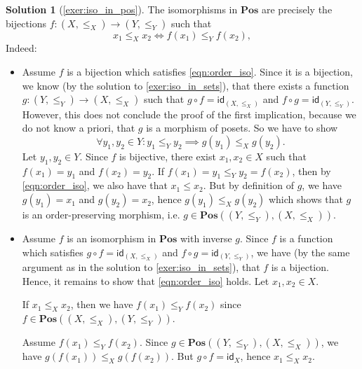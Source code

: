 \documentclass[a4paper,11pt, oneside,titlepage=false]{scrbook}
\theoremstyle{plain}
\theoremstyle{definition}
\newtheorem{solution}[thm]{Solution}
\newcommand{\cfont}[1]{\ensuremath{\mathsf{#1}}}
\newcommand{\Catb}[1]{\mathbf{#1}}
\newcommand{\POS}{\Catb{Pos}}
\newcommand{\CHom}[3]{{#1}(#2,#3)}
\newcommand{\Id}[1][]{\cfont{id}_{#1}}
\newcommand{\co}[2]{\ensuremath{#2 \circ #1}}
\begin{document}
\begin{solution}[\cref{exer:iso_in_pos}]\label{sol:iso_in_pos}
The isomorphisms in $\POS$ are precisely the bijections $f:(X,\leq_X) \to (Y,\leq_Y)$ such that
\begin{equation}\label{eqn:order_iso}
x_1 \leq_X x_2 \iff f(x_1) \leq_Y f(x_2),
\end{equation}
Indeed:
\begin{itemize}
\item Assume $f$ is a bijection which satisfies \cref{eqn:order_iso}. Since it is a bijection, we know (by the solution to \cref{exer:iso_in_sets}), that there exists a function $g:(Y,\leq_Y)\to (X,\leq_X)$ such that $\co{f}{g}=\Id[(X,\leq_X)]$ and $\co{g}{f}=\Id[(Y,\leq_Y)]$. However, this does not conclude the proof of the first implication, because we do not know a priori, that $g$ is a morphism of posets. So we have to show
\[
\forall y_1,y_2\in Y: y_1\leq_Y y_2 \implies g(y_1)\leq_X g(y_2).
\]
Let $y_1,y_2\in Y$. Since $f$ is bijective, there exist $x_1,x_2 \in X$ such that $f(x_1)=y_1$ and $f(x_2)=y_2$. If $f(x_1) = y_1\leq_Y y_2 = f(x_2)$, then by \cref{eqn:order_iso}, we also have that $x_1 \leq x_2$. But by definition of $g$, we have $g(y_1)=x_1$ and $g(y_2)=x_2$, hence $g(y_1)\leq_X g(y_2)$ which shows that $g$ is an order-preserving morphism, i.e. $g \in \CHom{\POS}{(Y,\leq_Y)}{(X,\leq_X)}$.
\item Assume $f$ is an isomorphism in $\POS$ with inverse $g$. Since $f$ is a function which satisfies $\co{f}{g}=\Id[(X,\leq_X)]$ and $\co{g}{f}=\Id[(Y,\leq_Y)]$, we have (by the same argument as in the solution to \cref{exer:iso_in_sets}), that $f$ is a bijection. Hence, it remains to show that \cref{eqn:order_iso} holds. Let $x_1,x_2\in X$.

  If $x_1\leq_X x_2$, then we have $f(x_1)\leq_Y f(x_2)$ since $f \in\CHom{\POS}{(X,\leq_X)}{(Y,\leq_Y)}$.

Assume $f(x_1)\leq_Y f(x_2)$. Since $g \in\CHom{\POS}{(Y,\leq_Y)}{(X,\leq_X)}$, we have $g(f(x_1)) \leq_X g(f(x_2))$. But $\co{f}{g} = \Id[X]$, hence $x_1 \leq_X x_2$.
\end{itemize}
\end{solution}
\end{document}
